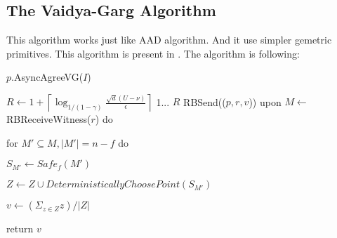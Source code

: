 \subsection{The Vaidya-Garg Algorithm}
This algorithm works just like AAD algorithm. And it use simpler gemetric primitives.
This algorithm is present in \cite{vaidya2013byzantine}. The algorithm is following\cite{mendes2015multidimensional}:

\begin{algorithm}
\caption{$p$.AsyncAgreeVG($I$)}
\begin{algorithmic}

    \State $R \leftarrow 1 + \left\lceil \log_{1/(1-\gamma)}\frac{\sqrt{d}(U - \nu)}{\epsilon} \right\rceil $
     {1}... {$R$}
        \State RBSend(($p, r, v$))
        \State upon $M \leftarrow$ RBReceiveWitness($r$) do

        \hspace{0.2cm} for $M\prime \subseteq M, |M\prime| = n - f $ do

        \hspace{0.4cm} $S_{M\prime} \leftarrow Safe_{f}(M\prime)$

        \hspace{0.4cm} $Z \leftarrow Z \cup DeterministicallyChoosePoint(S_{M\prime})$

        \hspace{0.2cm} $v \leftarrow (\Sigma_{z \in Z}z)/|Z|$
    \EndFor

    \State return $v$
\end{algorithmic}
\end{algorithm}
